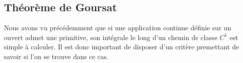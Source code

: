 




\subsection{Théorème de Goursat}
 Nous avons vu précédemment que si une application continue définie sur un ouvert admet une primitive, son intégrale le long d'un chemin de classe $C^1$ est simple à calculer. Il est donc important de disposer d'un critère premettant de savoir si l'on se trouve dans ce cas.

